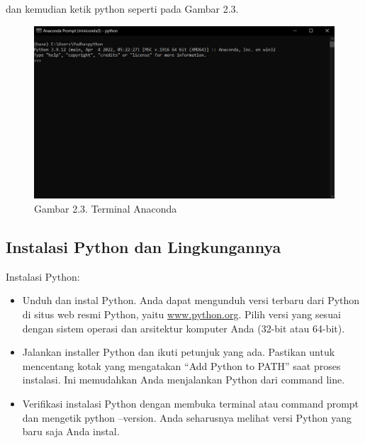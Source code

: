 \documentclass[
  letterpaper,
  DIV=11,
  numbers=noendperiod]{scrreprt}
\providecommand{\tightlist}{%
  \setlength{\itemsep}{0pt}\setlength{\parskip}{0pt}}\usepackage{longtable,booktabs,array}
\begin{document}
dan kemudian ketik python seperti pada Gambar 2.3.

\begin{figure}

{\centering \includegraphics{Asset/image8.png}

}

\caption{Gambar 2.3. Terminal Anaconda}

\end{figure}

\hypertarget{instalasi-python-dan-lingkungannya}{%
\subsection*{Instalasi Python dan
Lingkungannya}\label{instalasi-python-dan-lingkungannya}}

Instalasi Python:

\begin{itemize}
\tightlist
\item
  Unduh dan instal Python. Anda dapat mengunduh versi terbaru dari
  Python di situs web resmi Python, yaitu
  \href{https://www.python.org/}{www.python.org}. Pilih versi yang
  sesuai dengan sistem operasi dan arsitektur komputer Anda (32-bit atau
  64-bit).\\
\item
  Jalankan installer Python dan ikuti petunjuk yang ada. Pastikan untuk
  mencentang kotak yang mengatakan ``Add Python to PATH'' saat proses
  instalasi. Ini memudahkan Anda menjalankan Python dari command line.\\
\item
  Verifikasi instalasi Python dengan membuka terminal atau command
  prompt dan mengetik python --version. Anda seharusnya melihat versi
  Python yang baru saja Anda instal.
\end{itemize}
\end{document}
